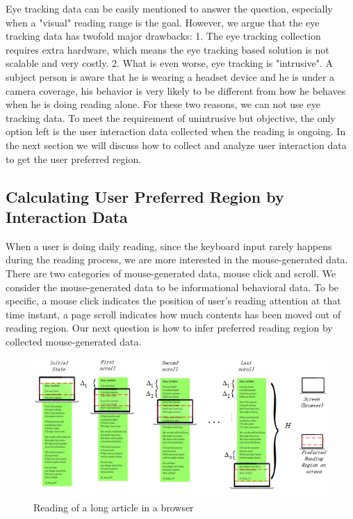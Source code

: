 \documentclass{sigchi}
\begin{document}
Eye tracking data can be easily mentioned to answer the question, especially when a "visual" reading range is 
the goal. However, we argue that the eye tracking data has twofold major drawbacks: 1. The eye tracking collection 
requires extra hardware, which means the eye tracking  based solution  is not scalable and very costly. 2. What is even worse, 
eye tracking is "intrusive". A subject person is aware that he is wearing a headset device and he is under a camera coverage, 
his behavior is very likely to be different from how he behaves when he is doing reading alone. For these two reasons, we 
can not use eye tracking data. To meet the requirement of unintrusive but objective, the only option left is the user interaction data 
collected when the reading is ongoing.  In the next section we will discuss how to 
collect and analyze user interaction data to get the user preferred region.  


\subsection{Calculating User Preferred Region by Interaction Data}

When a user is doing daily reading,  since the keyboard input rarely happens 
during the reading process,  we are more interested in the mouse-generated data. 
There are two categories of mouse-generated data, mouse click and scroll.  We consider the mouse-generated data to be 
informational  behavioral data. To be specific, a  mouse click indicates the position of user's reading attention at that time instant, 
a page scroll indicates how much contents has been moved out of reading region. Our next question is how to infer 
preferred reading region by collected mouse-generated data. 


\begin{figure}[t]
\centering
\includegraphics[width=1.5\columnwidth]{pictures/scroll}
\caption{Reading of a long article in a browser}
\label{fig:scroll}
\end{figure}
\end{document}
